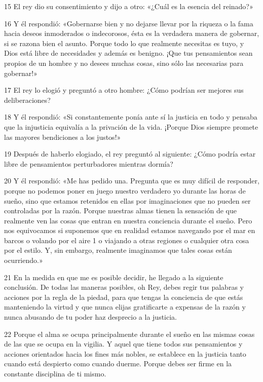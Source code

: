 \par 15 El rey dio su consentimiento y dijo a otro: «¿Cuál es la esencia del reinado?»

\par 16 Y él respondió: «Gobernarse bien y no dejarse llevar por la riqueza o la fama hacia deseos inmoderados o indecorosos, ésta es la verdadera manera de gobernar, si se razona bien el asunto. Porque todo lo que realmente necesitas es tuyo, y Dios está libre de necesidades y además es benigno. ¡Que tus pensamientos sean propios de un hombre y no desees muchas cosas, sino sólo las necesarias para gobernar!»

\par 17 El rey lo elogió y preguntó a otro hombre: ¿Cómo podrían ser mejores sus deliberaciones?

\par 18 Y él respondió: «Si constantemente ponía ante sí la justicia en todo y pensaba que la injusticia equivalía a la privación de la vida. ¡Porque Dios siempre promete las mayores bendiciones a los justos!»

\par 19 Después de haberlo elogiado, el rey preguntó al siguiente: ¿Cómo podría estar libre de pensamientos perturbadores mientras dormía?

\par 20 Y él respondió: «Me has pedido una. Pregunta que es muy difícil de responder, porque no podemos poner en juego nuestro verdadero yo durante las horas de sueño, sino que estamos retenidos en ellas por imaginaciones que no pueden ser controladas por la razón. Porque nuestras almas tienen la sensación de que realmente ven las cosas que entran en nuestra conciencia durante el sueño. Pero nos equivocamos si suponemos que en realidad estamos navegando por el mar en barcos o volando por el aire 1 o viajando a otras regiones o cualquier otra cosa por el estilo. Y, sin embargo, realmente imaginamos que tales cosas están ocurriendo.»

\par 21 En la medida en que me es posible decidir, he llegado a la siguiente conclusión. De todas las maneras posibles, oh Rey, debes regir tus palabras y acciones por la regla de la piedad, para que tengas la conciencia de que estás manteniendo la virtud y que nunca elijas gratificarte a expensas de la razón y nunca abusando de tu poder haz desprecio a la justicia.

\par 22 Porque el alma se ocupa principalmente durante el sueño en las mismas cosas de las que se ocupa en la vigilia. Y aquel que tiene todos sus pensamientos y acciones orientados hacia los fines más nobles, se establece en la justicia tanto cuando está despierto como cuando duerme. Porque debes ser firme en la constante disciplina de ti mismo.

